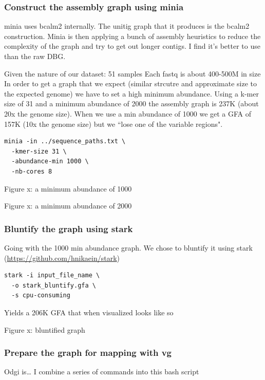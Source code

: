 \documentclass[a4paper]{article}
\begin{document}
\subsubsection{Construct the assembly graph  using minia}
\label{sec:org5a210a7}
minia uses bcalm2 internally. The unitig graph that it produces is the bcalm2
construction.
Minia is then applying a bunch of assembly heuristics to reduce the complexity
 of the graph and try to get out longer contigs. I find it's better to use than 
the raw DBG.

Given the nature of our dataset: 
51 samples
Each fastq is about 400-500M in size
In order to get a graph that we expect (similar strcutre and approximate size to
the expected genome) we have to set a high minimum abundance.
Using a k-mer size of 31 and a minimum abundance of 2000 the assembly graph is
237K (about 20x the genome size).  When we use a min abundance of 1000 we get a
GFA of 157K (10x the genome size) but we “lose one of the variable regions".

\begin{verbatim}
minia -in ../sequence_paths.txt \
  -kmer-size 31 \
  -abundance-min 1000 \
  -nb-cores 8
\end{verbatim}

Figure x: a minimum abundance of 1000

Figure x: a minimum abundance of 2000
\subsubsection{Bluntify the graph using stark}
\label{sec:orga202aae}
Going with the 1000 min abundance graph. We chose to bluntify it using stark
(\url{https://github.com/hnikaein/stark}) 

\begin{verbatim}
stark -i input_file_name \
  -o stark_bluntify.gfa \
  -s cpu-consuming
\end{verbatim}

Yields a  206K GFA that when visualized looks like so

Figure x: bluntified graph 


\subsubsection{Prepare the graph for mapping with vg}
\label{sec:orgba25f1d}
Odgi is\ldots{}
I combine a series of commands into this bash script
\end{document}
